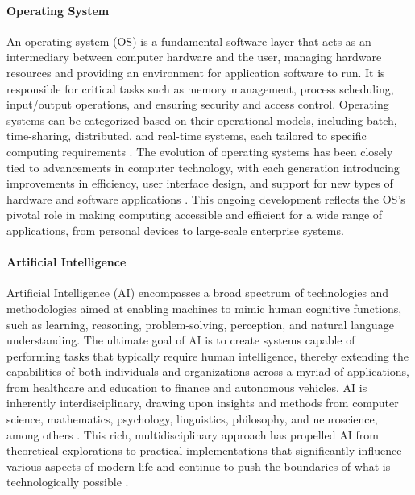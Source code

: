 \documentclass{article}
\begin{document}
\paragraph{Operating System}
An operating system (OS) is a fundamental software layer that acts as an intermediary between computer hardware and the user, managing hardware resources and providing an environment for application software to run. It is responsible for critical tasks such as memory management, process scheduling, input/output operations, and ensuring security and access control. Operating systems can be categorized based on their operational models, including batch, time-sharing, distributed, and real-time systems, each tailored to specific computing requirements \cite{TanenbaumWoodhull2006}. The evolution of operating systems has been closely tied to advancements in computer technology, with each generation introducing improvements in efficiency, user interface design, and support for new types of hardware and software applications \cite{SilberschatzGalvinGagne2018}. This ongoing development reflects the OS's pivotal role in making computing accessible and efficient for a wide range of applications, from personal devices to large-scale enterprise systems.

\paragraph{Artificial Intelligence}
Artificial Intelligence (AI) encompasses a broad spectrum of technologies and methodologies aimed at enabling machines to mimic human cognitive functions, such as learning, reasoning, problem-solving, perception, and natural language understanding. The ultimate goal of AI is to create systems capable of performing tasks that typically require human intelligence, thereby extending the capabilities of both individuals and organizations across a myriad of applications, from healthcare and education to finance and autonomous vehicles. AI is inherently interdisciplinary, drawing upon insights and methods from computer science, mathematics, psychology, linguistics, philosophy, and neuroscience, among others \cite{RussellNorvig2020}. This rich, multidisciplinary approach has propelled AI from theoretical explorations to practical implementations that significantly influence various aspects of modern life and continue to push the boundaries of what is technologically possible \cite{KaplanHaenlein2019}.
\end{document}
